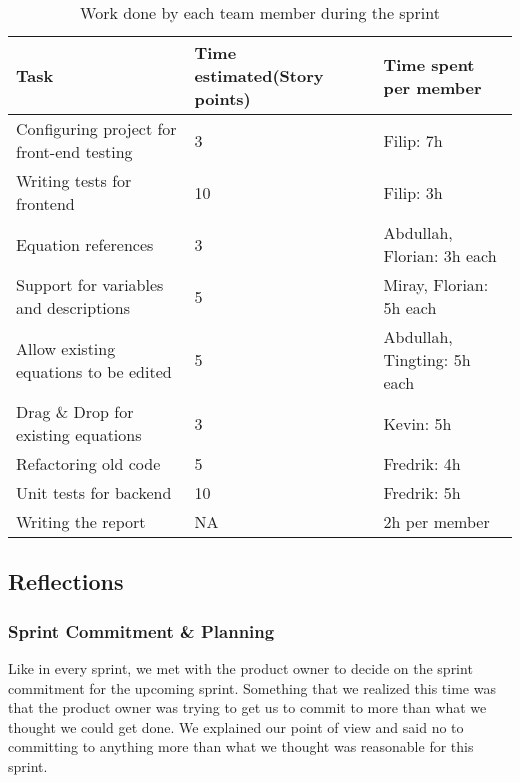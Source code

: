 \documentclass[14]{article}
\begin{document}
\begin{table}[H]
    \centering
    \begin{tabular}{|p{}|l|p{}|}
        \hline
        \textbf{Task} & \textbf{Time estimated(Story points)} & \textbf{Time spent per member}  \\
        \hline
        Configuring project for front-end testing & 3 & Filip: 7h  \\
        \hline
        Writing tests for frontend & 10 & Filip: 3h  \\
        \hline
        Equation references & 3 & Abdullah, Florian: 3h each  \\
        \hline        
        Support for variables and descriptions & 5 & Miray, Florian: 5h each  \\
        \hline        
        Allow existing equations to be edited & 5 & Abdullah, Tingting: 5h each  \\   
        \hline
        Drag \& Drop for existing equations & 3 & Kevin: 5h  \\
        \hline
        Refactoring old code & 5 & Fredrik: 4h  \\
        \hline
        Unit tests for backend & 10 & Fredrik: 5h  \\
        \hline
        Writing the report & NA & 2h per member  \\
        \hline        
             
        
    \end{tabular}
    \caption{Work done by each team member during the sprint}
    \label{tab:my_label}
\end{table}


\subsection{Reflections}


\subsubsection{Sprint Commitment \& Planning}

Like in every sprint, we met with the product owner to decide on the sprint commitment for the upcoming sprint. Something that we realized this time was that the product owner was trying to get us to commit to more than what we thought we could get done. We explained our point of view and said no to committing to anything more than what we thought was reasonable for this sprint. 
\end{document}
